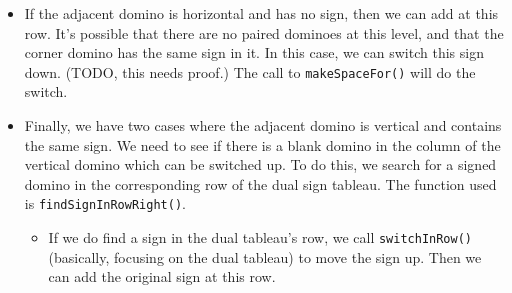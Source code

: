 \documentclass[12pt]{article}
\numberwithin{equation}{section}
\newcommand{\horizontalDominoMaybe}[3]{\filldraw [dominoMaybeStyle] (#2 - 1 + \eps, #1 - 1 + \eps) rectangle + (2 - \teps, 1 -\teps) node [dominoText] {$#3$};}
\newcommand{\verticalDominoMaybeShift}[4]{\filldraw [dominoMaybeStyle] (#2 - 1 + #4 + \eps,  #1 - 1 + \eps) rectangle + (1 - \teps,2 -\teps) node [dominoText] {$#3$};}
\newcommand{\greenCircle}[2]{\filldraw[green] (#2 - .5, #1 - .5) circle (.2cm);}
\begin{document}
\begin{itemize}
\begin{itemize}
      \begin{figure}[H]
        \centering
      \end{figure}
    \end{itemize}
    \item If the adjacent domino is horizontal and has no sign, then we can add at this row.
    It's possible that there are no paired dominoes at this level, and that the corner domino has the same sign in it.
    In this case, we can switch this sign down.
    (TODO, this needs proof.)
    The call to \texttt{makeSpaceFor()} will do the switch.
    \begin{figure}[H]
      \centering
    \end{figure}
    \item Finally, we have two cases where the adjacent domino is vertical and contains the same sign.
    We need to see if there is a blank domino in the column of the vertical domino which can be switched up.
    To do this, we search for a signed domino in the corresponding row of the dual sign tableau.
    The function used is \texttt{findSignInRowRight()}.
    \begin{itemize}
      \item If we do find a sign in the dual tableau's row, we call \linebreak \texttt{switchInRow()} (basically, focusing on the dual tableau) to move the sign up.
      Then we can add the original sign at this row.
      \begin{figure}[H]
        \centering
\end{figure}
\end{itemize}
\end{itemize}
\end{document}
